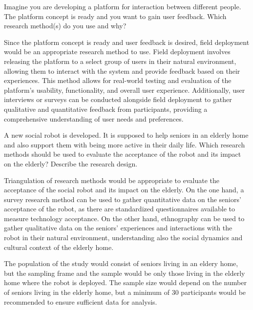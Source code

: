 \begin{ejercicio}
    Imagine you are developing a platform for interaction between different people. The platform concept is ready and you want to gain user feedback. Which research method(s) do you use and why?

    Since the platform concept is ready and user feedback is desired, field deployment would be an appropriate research method to use. Field deployment involves releasing the platform to a select group of users in their natural environment, allowing them to interact with the system and provide feedback based on their experiences. This method allows for real-world testing and evaluation of the platform's usability, functionality, and overall user experience. Additionally, user interviews or surveys can be conducted alongside field deployment to gather qualitative and quantitative feedback from participants, providing a comprehensive understanding of user needs and preferences.
\end{ejercicio}

\begin{ejercicio}
    A new social robot is developed. It is supposed to help seniors in an elderly home and also support them with being more active in their daily life. Which research methods should be used to evaluate the acceptance of the robot and its impact on the elderly? Describe the research design.

    Triangulation of research methods would be appropriate to evaluate the acceptance of the social robot and its impact on the elderly. On the one hand, a survey research method can be used to gather quantitative data on the seniors' acceptance of the robot, as there are standardized questionnaires available to measure technology acceptance. On the other hand, ethnography can be used to gather qualitative data on the seniors' experiences and interactions with the robot in their natural environment, understanding also the social dynamics and cultural context of the elderly home.

    The population of the study would consist of seniors living in an eldery home, but the sampling frame and the sample would be only those living in the elderly home where the robot is deployed. The sample size would depend on the number of seniors living in the elderly home, but a minimum of 30 participants would be recommended to ensure sufficient data for analysis.
\end{ejercicio}

